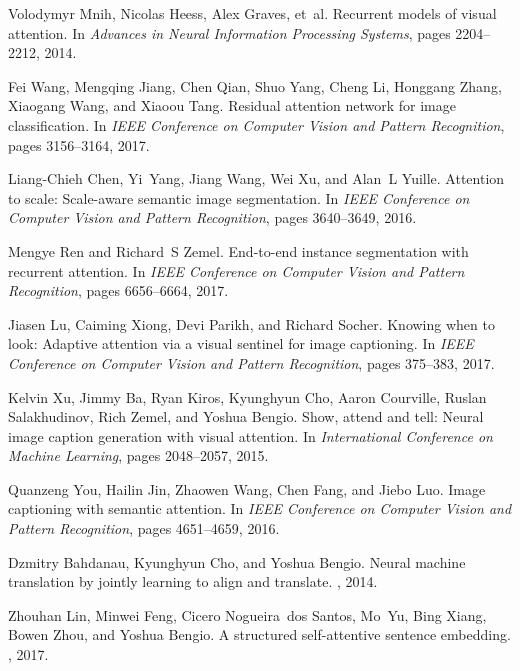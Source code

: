 \documentclass[journal]{IEEEtran}
\begin{document}
\begin{thebibliography}{10}
	Volodymyr Mnih, Nicolas Heess, Alex Graves, et~al.
	\newblock Recurrent models of visual attention.
	\newblock In {\em Advances in Neural Information Processing Systems}, pages
	2204--2212, 2014.
	
	Fei Wang, Mengqing Jiang, Chen Qian, Shuo Yang, Cheng Li, Honggang Zhang,
	Xiaogang Wang, and Xiaoou Tang.
	\newblock Residual attention network for image classification.
	\newblock In {\em IEEE Conference on Computer Vision and Pattern Recognition},
	pages 3156--3164, 2017.
	
	Liang-Chieh Chen, Yi~Yang, Jiang Wang, Wei Xu, and Alan~L Yuille.
	\newblock Attention to scale: Scale-aware semantic image segmentation.
	\newblock In {\em IEEE Conference on Computer Vision and Pattern Recognition},
	pages 3640--3649, 2016.
	
	Mengye Ren and Richard~S Zemel.
	\newblock End-to-end instance segmentation with recurrent attention.
	\newblock In {\em IEEE Conference on Computer Vision and Pattern Recognition},
	pages 6656--6664, 2017.
	
	Jiasen Lu, Caiming Xiong, Devi Parikh, and Richard Socher.
	\newblock Knowing when to look: Adaptive attention via a visual sentinel for
	image captioning.
	\newblock In {\em IEEE Conference on Computer Vision and Pattern Recognition},
	pages 375--383, 2017.
	
	Kelvin Xu, Jimmy Ba, Ryan Kiros, Kyunghyun Cho, Aaron Courville, Ruslan
	Salakhudinov, Rich Zemel, and Yoshua Bengio.
	\newblock Show, attend and tell: Neural image caption generation with visual
	attention.
	\newblock In {\em International Conference on Machine Learning}, pages
	2048--2057, 2015.
	
	Quanzeng You, Hailin Jin, Zhaowen Wang, Chen Fang, and Jiebo Luo.
	\newblock Image captioning with semantic attention.
	\newblock In {\em IEEE Conference on Computer Vision and Pattern Recognition},
	pages 4651--4659, 2016.
	
	Dzmitry Bahdanau, Kyunghyun Cho, and Yoshua Bengio.
	\newblock Neural machine translation by jointly learning to align and
	translate.
	, 2014.
	
	Zhouhan Lin, Minwei Feng, Cicero Nogueira~dos Santos, Mo~Yu, Bing Xiang, Bowen
	Zhou, and Yoshua Bengio.
	\newblock A structured self-attentive sentence embedding.
	, 2017.
	

\end{thebibliography}
\end{document}
